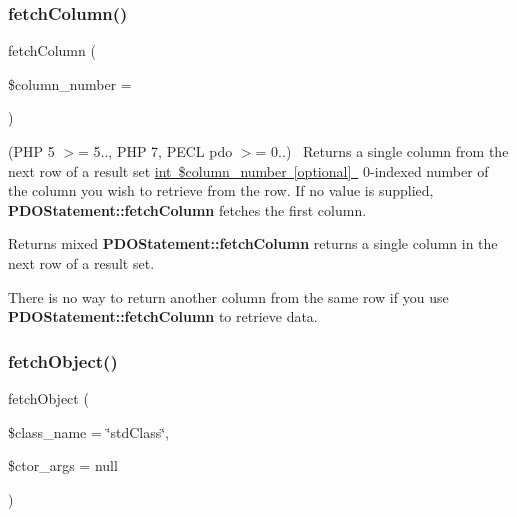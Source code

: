 \subsubsection{\texorpdfstring{fetch\+Column()}{fetchColumn()}}
{\footnotesize\ttfamily fetch\+Column (\begin{DoxyParamCaption}\item[{}]{\$column\+\_\+number = {} }\end{DoxyParamCaption})}

(P\+HP 5 $>$= 5.., P\+HP 7, P\+E\+CL pdo $>$= 0..)~\newline
 Returns a single column from the next row of a result set \mbox{\hyperlink{}{int \$column\+\_\+number \mbox{[}optional\mbox{]} }} 0-\/indexed number of the column you wish to retrieve from the row. If no value is supplied, {\bfseries P\+D\+O\+Statement\+::fetch\+Column} fetches the first column. 

\begin{DoxyReturn}{Returns}
mixed {\bfseries P\+D\+O\+Statement\+::fetch\+Column} returns a single column in the next row of a result set. 
\end{DoxyReturn}


There is no way to return another column from the same row if you use {\bfseries P\+D\+O\+Statement\+::fetch\+Column} to retrieve data. \mbox{\label{interface_pes_1_1_database_1_1_statement_1_1_p_d_o_statement_interface_adadbe1d7d334808106fcd3881ce45778}} 
\subsubsection{\texorpdfstring{fetch\+Object()}{fetchObject()}}
{\footnotesize\ttfamily fetch\+Object (\begin{DoxyParamCaption}\item[{}]{\$class\+\_\+name = {\ttfamily \char`\"{}stdClass\char`\"{}},  }\item[{}]{\$ctor\+\_\+args = {\ttfamily null} }\end{DoxyParamCaption})}

